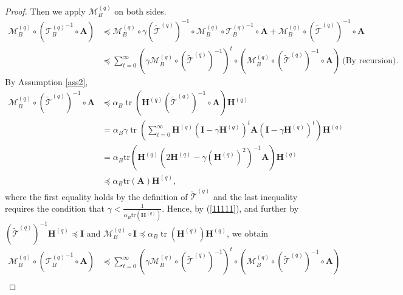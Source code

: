 \documentclass[11pt, letterpaper]{article}
\begin{document}
\begin{proof}
    Then we apply $\mathcal{M}_B^{(q)}$ on both sides.
    \begin{equation}
        \begin{aligned}
        \label{11111}
            \mathcal{M}_B^{(q)} \circ ({\mathcal{T}_B^{(q)}}^{-1}\circ\mathbf{A}) &\preceq \mathcal{M}_B^{(q)} \circ\gamma{(\widetilde{\mathcal{T}}^{(q)})}^{-1}\circ\mathcal{M}_B^{(q)}\circ{\mathcal{T}_B^{(q)}}^{-1}\circ\mathbf{A}+ \mathcal{M}_B^{(q)} \circ(\widetilde{\mathcal{T}}^{(q)})^{-1}\circ\mathbf{A}\\
            &\preceq\sum_{t=0}^\infty(\gamma\mathcal{M}_B^{(q)}\circ{(\widetilde{\mathcal{T}}^{(q)})}^{-1})^t\circ(\mathcal{M}_B^{(q)}\circ{(\widetilde{\mathcal{T}}^{(q)})}^{-1}\circ\mathbf{A}) \ \text{(By recursion)}.
        \end{aligned}
    \end{equation}
    By Assumption \ref{ass2}, 
    \begin{equation*}
        \begin{aligned}
            {\mathcal{M}_B^{(q)}}\circ{(\widetilde{\mathcal{T}}^{(q)})}^{-1}\circ\mathbf{A}&\preceq\alpha_B\operatorname{tr}(\mathbf{H}^{(q)}{(\widetilde{\mathcal{T}}^{(q)})}^{-1}\circ\mathbf{A})\mathbf{H}^{(q)}\\
            &= \alpha_B \gamma\operatorname{tr}\left(\sum_{t=0}^{\infty}\mathbf{H}^{(q)}(\mathbf{I}-\gamma\mathbf{H}^{(q)})^{t}\mathbf{A}(\mathbf{I}-\gamma\mathbf{H}^{(q)})^{t}\right) \mathbf{H}^{(q)}\\
            &= \alpha_B \mathrm{tr}\left(\mathbf{H}^{(q)}(2\mathbf{H}^{(q)}-\gamma(\mathbf{H}^{(q)})^{2})^{-1}\mathbf{A}\right)\mathbf{H}^{(q)}\\
            &\preceq \alpha_B \mathrm{tr}(\mathbf{A})\mathbf{H}^{(q)},
        \end{aligned}
    \end{equation*}
    where the first equality holds by the definition of $\widetilde{\mathcal{T}}^{(q)}$ and the last inequality requires the condition that $\gamma < \frac{1}{\alpha_B\mathrm{tr}(\mathbf{H}^{(q)})}$. Hence, by (\ref{11111}), and further by ${(\widetilde{\mathcal{T}}^{(q)})}^{-1}\mathbf{H}^{(q)}\preceq\mathbf{I}$ and $\mathcal{M}_B^{(q)}\circ\mathbf{I}\preceq\alpha_B\operatorname{tr}(\mathbf{H}^{(q)})\mathbf{H}^{(q)}$, we obtain
    \begin{equation*}
        \begin{aligned}
            \mathcal{M}_B^{(q)} \circ ({\mathcal{T}_B^{(q)}}^{-1}\circ\mathbf{A}) &\preceq\sum_{t=0}^\infty(\gamma\mathcal{M}_B^{(q)}\circ{(\widetilde{\mathcal{T}}^{(q)})}^{-1})^t\circ(\mathcal{M}_B^{(q)}\circ{(\widetilde{\mathcal{T}}^{(q)})}^{-1}\circ\mathbf{A})\\

\end{aligned}
\end{equation*}
\end{proof}
\end{document}
